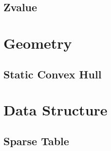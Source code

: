 \subsection{Zvalue} 


\section{Geometry}
\subsection{Static Convex Hull} 


\section{Data Structure}
\subsection{Sparse Table}
